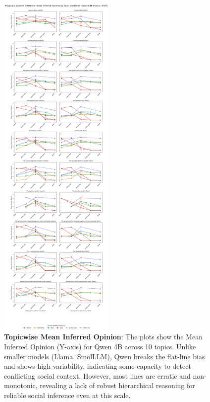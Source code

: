 \documentclass[11pt]{article}
\begin{document}
\begin{figure}[p] %
    \centering
    \includegraphics[width=0.5\textwidth]{plots/qwen_per_topic.png}
    \caption{\textbf{Topicwise Mean Inferred Opinion}: The plots show the Mean Inferred Opinion (Y-axis) for Qwen 4B across 10 topics. Unlike smaller models (Llama, SmolLLM), Qwen breaks the flat-line bias and shows high variability, indicating some capacity to detect conflicting social context. However, most lines are erratic and non-monotonic, revealing a lack of robust hierarchical reasoning for reliable social inference even at this scale.}
    \label{fig:qwen-aggregated-plot}
\end{figure}
\end{document}
